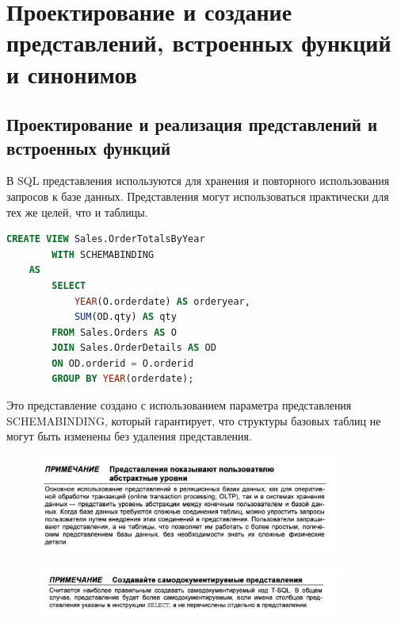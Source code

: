 \chapter{Проектирование и создание
представлений, встроенных функций
и синонимов}
\section{Проектирование и реализация
представлений и встроенных функций }

В SQL представления используются для хранения и повторного использования запросов к базе данных. Представления могут использоваться практически для тех же целей, что и таблицы.



\begin{lstlisting}[label=lst:funcReturn, language=sql]
	CREATE VIEW Sales.OrderTotalsByYear
		WITH SCHEMABINDING
	AS 
		SELECT
			YEAR(O.orderdate) AS orderyear,
			SUM(OD.qty) AS qty
		FROM Sales.Orders AS O
		JOIN Sales.OrderDetails AS OD
		ON OD.orderid = O.orderid
		GROUP BY YEAR(orderdate); 
\end{lstlisting}

Это представление создано с использованием параметра представления
SCHEMABINDING, который гарантирует, что структуры базовых таблиц не могут
быть изменены без удаления представления. 

\begin{figure}[h!]
	\begin{center}
		\includegraphics[width=0.9\textwidth]{img/advice16.png}
	\end{center}
	\captionsetup{justification=centering}
\end{figure}


\begin{figure}[h!]
	\begin{center}
		\includegraphics[width=0.9\textwidth]{img/advice17.png}
	\end{center}
	\captionsetup{justification=centering}
\end{figure}

